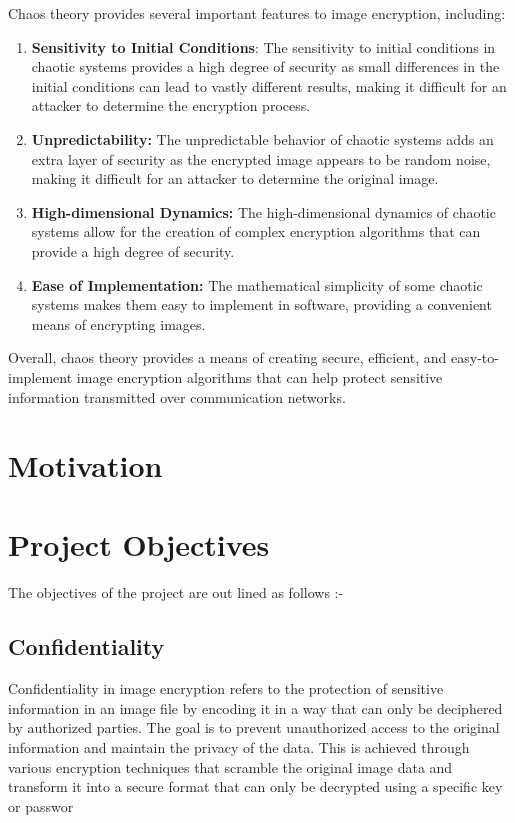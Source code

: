 \documentclass[11pt,a4paper,english]{article}
\begin{document}
Chaos theory provides several important features to image encryption, including:
\begin{enumerate}
    \item \textbf{Sensitivity to Initial Conditions}: The sensitivity to initial conditions in chaotic systems provides a high degree of security as small differences in the initial conditions can lead to vastly different results, making it difficult for an attacker to determine the encryption process.
    \item \textbf{Unpredictability:} The unpredictable behavior of chaotic systems adds an extra layer of security as the encrypted image appears to be random noise, making it difficult for an attacker to determine the original image.
    \item \textbf{High-dimensional Dynamics:} The high-dimensional dynamics of chaotic systems allow for the creation of complex encryption algorithms that can provide a high degree of security.
    \item \textbf{Ease of Implementation:} The mathematical simplicity of some chaotic systems makes them easy to implement in software, providing a convenient means of encrypting images.
\end{enumerate}
Overall, chaos theory provides a means of creating secure, efficient, and easy-to-implement image encryption algorithms that can help protect sensitive information transmitted over communication networks.
\newpage
\section{Motivation}
\newpage
\section{Project Objectives}
\paragraph{}
The objectives of the project are out lined as follows :-
\subsection{Confidentiality}Confidentiality in image encryption refers to the protection of sensitive information in an image file by encoding it in a way that can only be deciphered by authorized parties. The goal is to prevent unauthorized access to the original information and maintain the privacy of the data. This is achieved through various encryption techniques that scramble the original image data and transform it into a secure format that can only be decrypted using a specific key or passwor
\end{document}
